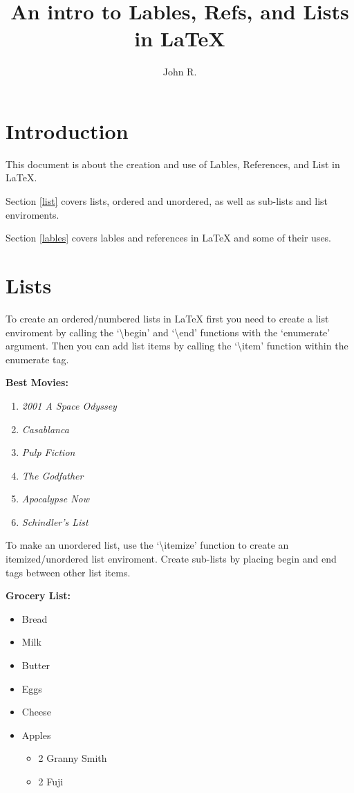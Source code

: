 \documentclass{article}
\author{John R.}
\title{An intro to Lables, Refs, and Lists in {\LaTeX}}
\begin{document}
\maketitle

\section{Introduction}
This document is about the creation and use of Lables, References, and List in {\LaTeX}.

Section \ref{list} covers lists, ordered and unordered, as well as sub-lists and list enviroments.

Section \ref{lables} covers lables and references in LaTeX and some of their uses.

\section{Lists\label{list}}

To create an ordered/numbered lists in LaTeX first you need to create a list enviroment by calling the `\textbackslash begin' and `\textbackslash end' functions with the `enumerate' argument. Then you can add list items by calling the `\textbackslash item' function within the enumerate tag.

\textbf{Best Movies:}

\begin{enumerate}

\item \textit{2001 A Space Odyssey}
\item \textit{Casablanca}
\item \textit{Pulp Fiction}
\item \textit{The Godfather}
\item \textit{Apocalypse Now}
\item \textit{Schindler's List}

\end{enumerate}

To make an unordered list, use the `\textbackslash itemize' function to create an itemized/unordered list enviroment. Create sub-lists by placing begin and end tags between other list items.

\textbf{Grocery List:}

\begin{itemize}

\item Bread
\item Milk 
\item Butter
\item Eggs
\item Cheese
\item Apples
\begin{itemize}
\item 2 Granny Smith
\item 2 Fuji
\end{itemize}

\end{itemize}
\end{document}
